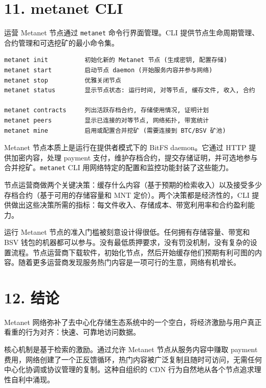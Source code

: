 \documentclass[11pt,a4paper]{article}
\begin{document}
\section{11. metanet CLI}

运营 Metanet 节点通过 \texttt{metanet} 命令行界面管理。CLI 提供节点生命周期管理、合约管理和可选挖矿的最小命令集。

\begin{lstlisting}
metanet init          初始化新的 Metanet 节点 (生成密钥, 配置存储)
metanet start         启动节点 daemon (开始服务内容并参与网络)
metanet stop          优雅关闭节点
metanet status        显示节点状态: 运行时间, 对等节点, 缓存文件, 收入, 合约

metanet contracts     列出活跃存档合约, 存储使用情况, 证明计划
metanet peers         显示已连接的对等节点, 网络拓扑, 带宽统计
metanet mine          启用或配置合并挖矿 (需要连接到 BTC/BSV 矿池)
\end{lstlisting}

Metanet 节点本质上是运行在提供者模式下的 BitFS daemon。它通过 HTTP 提供加密内容，处理 payment 支付，维护存档合约，提交存储证明，并可选地参与合并挖矿。\texttt{metanet} CLI 用网络特定的配置和监控功能封装了这些能力。

节点运营商做两个关键决策：缓存什么内容（基于预期的检索收入）以及接受多少存档合约（基于可用的存储容量和 MNT 定价）。两个决策都是经济性的，CLI 提供做出这些决策所需的指标：每文件收入、存储成本、带宽利用率和合约盈利能力。

运行 Metanet 节点的准入门槛被刻意设计得很低。任何拥有存储容量、带宽和 BSV 钱包的机器都可以参与。没有最低质押要求，没有罚没机制，没有复杂的设置流程。节点运营商下载软件，初始化节点，然后开始缓存他们预期有利可图的内容。随着更多运营商发现服务热门内容是一项可行的生意，网络有机增长。

\section{12. 结论}

Metanet 网络弥补了去中心化存储生态系统中的一个空白，将经济激励与用户真正看重的行为对齐：快速、可靠地访问数据。

核心机制是基于检索的激励。通过允许 Metanet 节点从服务内容中赚取 payment 费用，网络创建了一个正反馈循环，热门内容被广泛复制且随时可访问，无需任何中心化协调或协议管理的复制。这种自组织的 CDN 行为自然地从各个节点追求理性自利中涌现。
\end{document}
